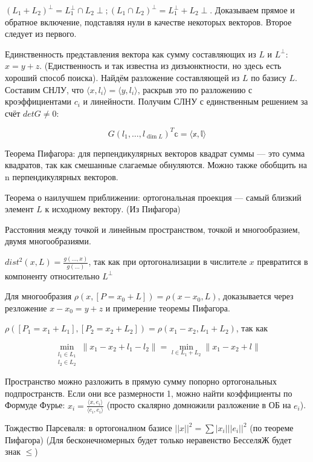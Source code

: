 \documentclass[12pt, a4paper]{article}
\begin{document}
$(L_1 + L_2)^\perp = L_1^\perp \cap L_2\perp; (L_1 \cap L_2)^\perp = L_1^\perp + L_2\perp$. 
Доказываем прямое и обратное включение, подставляя нули в качестве некоторых векторов.
Второе следует из первого.

Единственность представления вектора как сумму составляющих из $L$ и $L^\perp$: $x = y + z$. 
(Едиственность и так известна из дизъюнктности, но здесь есть хороший способ поиска).
Найдём разложение составляющей из $L$ по базису $L$. Составим СНЛУ, что $\langle x, l_i \rangle = \langle y, l_i \rangle$,
раскрыв это по разложению с кроэффициентами $c_i$ и линейности.
Получим СЛНУ с единственным решением за счёт $det G \neq 0$:

\begin{equation}
    G(l_1, …, l_{\dim L})^T \mathbb{c} = \langle \mathbb{x, l} \rangle
\end{equation}

Теорема Пифагора: для перпендикулярных векторов квадрат суммы — это сумма квадратов, так как смешанные слагаемые обнуляются.
Можно также обобщить на n перпендикулярных векторов.

Теорема о наилучшем приближении: ортогональная проекция — самый близкий элемент $L$ к исходному вектору. (Из Пифагора)

Расстояния между точкой и линейным пространством, точкой и многообразием, двумя многообразиями.

$dist^2(x, L) = \frac{g(…, x)}{g(…)}$, так как при ортогонализации в числителе $x$ превратится в компоненту относительно $L^{\perp}$

Для многообразия $\rho(x, [P = x_0 + L]) = \rho(x - x_0, L)$, доказывается через резложение $x - x_0 = y + z$ и примерение теоремы Пифагора.

$\rho([P_1 = x_1 + L_1], [P_2 = x_2 + L_2]) = \rho(x_1 - x_2, L_1 + L_2)$, так как 

\begin{equation}
    \min_{\substack{l_{1} \in L_{1} \\ l_{2} \in L_{2}}} \left\| x_1 - x_2 + l_1 - l_2\right\| = 
    \min_{l \in L_{1}+L_{2}} \left\|x_1 - x_2 + l\right\|
\end{equation}

Пространство можно разложить в прямую сумму попорно ортогональных подпространств.
Если они все размерности 1, можно найти коэффициенты по Формуде Фурье: $x_i = \frac{\langle x, e_i \rangle}{\langle e_i, e_i \rangle}$ (просто скалярно домножили разложение в ОБ на $e_i$).

Тождество Парсеваля: в ортогоналном базисе $||x||^2 = \sum |x_i| ||e_i||^2$ (по теореме Пифагора)
(Для бесконечномерных будет только неравенство БесселяЖ будет знак $\leqslant$)
\end{document}
